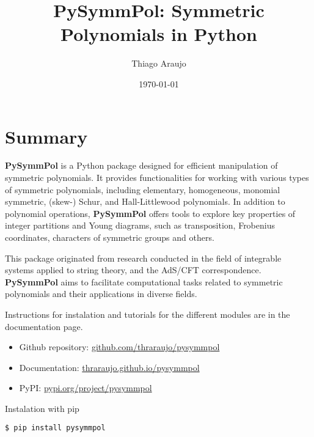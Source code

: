 \documentclass[a4paper,10pt]{amsart}
\begin{document}
\title[PySymmPol]{PySymmPol: Symmetric Polynomials in Python}

\author{Thiago Araujo}

\address{\noindent 
Instituto de Física Teórica, UNESP-Universidade Estadual Paulista,
R. Dr. Bento T. Ferraz 271, Bl. II, Sao Paulo 01140-070, SP, Brazil\\
\&
Instituto de Física, Universidade de S\~ao Paulo,
Rua do Matão Travessa 1371, 05508-090 São Paulo, SP. Brazil
}


\date{\today}

\maketitle

\setcounter{tocdepth}{1}
\tableofcontents


\section{Summary}

\textbf{PySymmPol} is a Python package designed for efficient manipulation of
symmetric polynomials. It provides functionalities for working with
various types of symmetric polynomials, including elementary,
homogeneous, monomial symmetric, (skew-) Schur, and Hall-Littlewood
polynomials. In addition to polynomial operations, \textbf{PySymmPol} offers
tools to explore key properties of integer partitions and Young
diagrams, such as transposition, Frobenius coordinates, characters of
symmetric groups and others. 

This package originated from research conducted in the field of
integrable systems applied to string theory, and the AdS/CFT
correspondence. \textbf{PySymmPol} aims to facilitate computational tasks
related to symmetric polynomials and their applications in diverse
fields.

Instructions for instalation and tutorials for the different modules
are in the documentation page. 
\begin{itemize}
    \item Github repository: \href{https://github.com/thraraujo/pysymmpol}{github.com/thraraujo/pysymmpol}
    \item Documentation: \href{https://thraraujo.github.io/pysymmpol}{thraraujo.github.io/pysymmpol}
    \item PyPI: \href{https://pypi.org/project/pysymmpol}{pypi.org/project/pysymmpol}
\end{itemize}
Instalation with pip 
\begin{lstlisting}[language=Python]
  $ pip install pysymmpol
\end{lstlisting}
\end{document}
